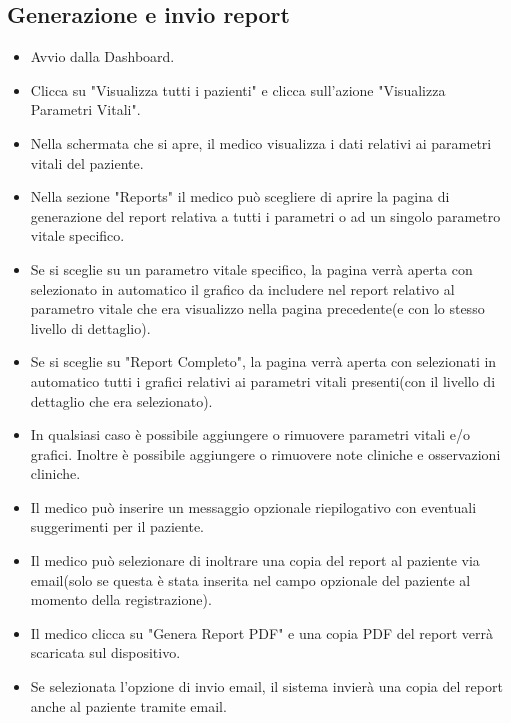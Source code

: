 \documentclass[12pt,a4paper,oneside]{report}
\begin{document}
\subsection{Generazione e invio report}
\begin{itemize}
  \item Avvio dalla Dashboard.
    \item Clicca su "Visualizza tutti i pazienti" e clicca sull'azione "Visualizza Parametri Vitali".
    \item Nella schermata che si apre, il medico visualizza i dati relativi ai parametri vitali del paziente.
  \item Nella sezione "Reports" il medico può scegliere di aprire la pagina di generazione del report relativa a tutti i parametri o ad un singolo parametro vitale specifico.
    \item Se si sceglie su un parametro vitale specifico, la pagina verrà aperta con selezionato in automatico il grafico da includere nel report relativo al parametro vitale che era visualizzo nella pagina precedente(e con lo stesso livello di dettaglio).
    \item Se si sceglie su "Report Completo", la pagina verrà aperta con selezionati in automatico tutti i grafici relativi ai parametri vitali presenti(con il livello di dettaglio che era selezionato).
    \item In qualsiasi caso è possibile aggiungere o rimuovere parametri vitali e/o grafici. Inoltre è possibile aggiungere o rimuovere note cliniche e osservazioni cliniche.
    \item Il medico può inserire un messaggio opzionale riepilogativo con eventuali suggerimenti per il paziente.
    \item Il medico può selezionare di inoltrare una copia del report al paziente via email(solo se questa è stata inserita nel campo opzionale del paziente al momento della registrazione).
  \item Il medico clicca su "Genera Report PDF" e una copia PDF del report verrà scaricata sul dispositivo.
    \item Se selezionata l'opzione di invio email, il sistema invierà una copia del report anche al paziente tramite email.
\end{itemize}
\end{document}

